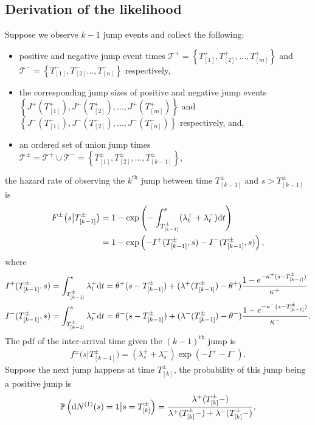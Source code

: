 \documentclass[11pt,a4paper]{article}
\numberwithin{equation}{section}
\theoremstyle{remark}
\theoremstyle{definition}
\newcommand{\dd}{{\rm d}}
\begin{document}
\subsection{Derivation of the likelihood}
Suppose we observe $k-1$ jump events and collect the following:
\begin{itemize}
\item positive and negative jump event times\newline
$\mathcal{T}^+ = \left\{T^{+}_{[1]}, T^{+}_{[2]},..., T^{+}_{[m]}\right\}$ and $\mathcal{T}^- =\left\{T^{-}_{[1]}, T^{-}_{[2]} ..., T^{-}_{[n]}\right\}$ respectively,
\item the corresponding jump sizes of positive and negative jump events\newline
$\left\{J^+(T^{+}_{[1]}), J^+(T^{+}_{[2]}),..., J^+(T^{+}_{[m]})\right\}$ and $\left\{J^-(T^{-}_{[1]}), J^-(T^{-}_{[2]}), ..., J^-(T^{-}_{[n]})\right\}$ respectively, and,
\item an ordered set of union jump times $\mathcal{T}^\pm = \mathcal{T}^+ \cup \mathcal{T}^- = \left\{T^\pm_{[1]}, T^\pm_{[2]},..., T^\pm_{[k-1]}\right\} $,
\end{itemize}
 the hazard rate of observing the $k^{\text{th}}$ jump between time $T^\pm_{[k-1]}$ and $s > T^\pm_{[k-1]}$ is
\begin{align*}
F^\pm \big(s\big|T^\pm_{[k-1]}\big) &= 1-\exp\left(-\int_{T^\pm_{[k-1]}}^s(\lambda^+_t + \lambda^-_t)\dd t\right)\\
                                    &= 1-\exp\left(-I^+(T^\pm_{[k-1]}, s)-I^-(T^\pm_{[k-1]}, s)\right),
\end{align*}
where
\begin{align*}
  I^+(T^\pm_{[k-1]}, s) & = \int_{T^\pm_{[k-1]}}^s \lambda^+_t \dd t = \theta^+(s-T^\pm_{[k-1]}) + (\lambda^+(T^\pm_{[k-1]})-\theta^+)\frac{1-e^{-\kappa^+(s-T^\pm_{[k-1]})}}{\kappa^+}\\
  I^-(T^\pm_{[k-1]}, s) & = \int_{T^\pm_{[k-1]}}^s \lambda^-_t \dd t = \theta^-(s-T^\pm_{[k-1]}) + (\lambda^-(T^\pm_{[k-1]})-\theta^-)\frac{1-e^{-\kappa^-(s-T^\pm_{[k-1]})}}{\kappa^-}.
\end{align*}
The pdf of the inter-arrival time given the $(k-1)^\text{th}$ jump is
\begin{align*}
f^\pm  \big(s\big|T^\pm_{[k-1]}\big) = (\lambda^+_s + \lambda^-_s)\exp(-I^+-I^-).
\end{align*}
Suppose the next jump happens at time $T^\pm_{[k]}$, the probability of this jump being a positive jump is
\begin{align*}
\mathbb{P}\left(\dd N^{(1)}(s)=1\big|s=T^\pm_{[k]}\right) = \frac{\lambda^+(T^\pm_{[k]}-)}{\lambda^+(T^\pm_{[k]}-)+\lambda^-(T^\pm_{[k]}-)},
\end{align*}
\end{document}
